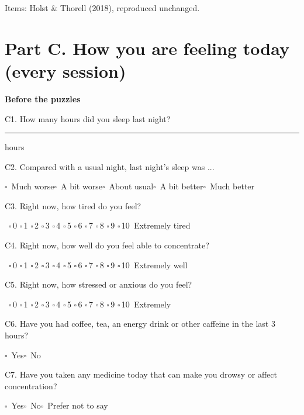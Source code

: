 \documentclass[10pt,a4paper]{article}
\newcommand{\blank}[1][1.2cm]{\rule{#1}{0.4pt}}
\newcommand{\bx}{$\square$}
\begin{document}
{\tiny Items: Holst \& Thorell (2018), reproduced unchanged.}
\clearpage\section*{Part C. How you are feeling today (every session)}
\textbf{Before the puzzles}\par
C1. How many hours did you sleep last night? \hfill \blank[1.5cm] hours\par\vspace{6pt}
C2. Compared with a usual night, last night's sleep was ...\par\hspace*{1em}\bx\ Much worse\quad \bx\ A bit worse\quad \bx\ About usual\quad \bx\ A bit better\quad \bx\ Much better\par\vspace{6pt}
C3. Right now, how tired do you feel?\par\hspace*{1em}{\small Not at all tired}\ \bx\,0 \bx\,1 \bx\,2 \bx\,3 \bx\,4 \bx\,5 \bx\,6 \bx\,7 \bx\,8 \bx\,9 \bx\,10\ {\small Extremely tired}\par\vspace{6pt}
C4. Right now, how well do you feel able to concentrate?\par\hspace*{1em}{\small Not at all}\ \bx\,0 \bx\,1 \bx\,2 \bx\,3 \bx\,4 \bx\,5 \bx\,6 \bx\,7 \bx\,8 \bx\,9 \bx\,10\ {\small Extremely well}\par\vspace{6pt}
C5. Right now, how stressed or anxious do you feel?\par\hspace*{1em}{\small Not at all}\ \bx\,0 \bx\,1 \bx\,2 \bx\,3 \bx\,4 \bx\,5 \bx\,6 \bx\,7 \bx\,8 \bx\,9 \bx\,10\ {\small Extremely}\par\vspace{6pt}
C6. Have you had coffee, tea, an energy drink or other caffeine in the last 3 hours?\par\hspace*{1em}\bx\ Yes\quad \bx\ No\par\vspace{6pt}
C7. Have you taken any medicine today that can make you drowsy or affect concentration?\par\hspace*{1em}\bx\ Yes\quad \bx\ No\quad \bx\ Prefer not to say\par\vspace{6pt}
\end{document}

